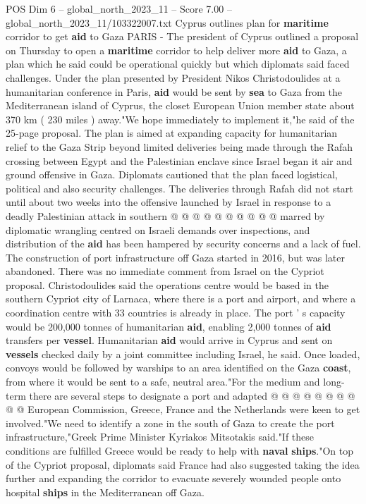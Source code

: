 \begin{textsample}{POS Dim 6 – global\_north\_2023\_11 – Score 7.00 – global\_north\_2023\_11/103322007.txt}  \label{ex:f6_pos_211}
Cyprus outlines plan for \textbf{maritime} corridor to get \textbf{aid} to Gaza PARIS - The president of Cyprus outlined a proposal on Thursday to open a \textbf{maritime} corridor to help deliver more \textbf{aid} to Gaza, a plan which he said could be operational quickly but which diplomats said faced challenges.
Under the plan presented by President Nikos Christodoulides at a humanitarian conference in Paris, \textbf{aid} would be sent by \textbf{sea} to Gaza from the Mediterranean island of Cyprus, the closet European Union member state about 370 km ( 230 miles ) away."We hope immediately to implement it,"he said of the 25-page proposal.
The plan is aimed at expanding capacity for humanitarian relief to the Gaza Strip beyond limited deliveries being made through the Rafah crossing between Egypt and the Palestinian enclave since Israel began it air and ground offensive in Gaza.
Diplomats cautioned that the plan faced logistical, political and also security challenges.
The deliveries through Rafah did not start until about two weeks into the offensive launched by Israel in response to a deadly Palestinian attack in southern @ @ @ @ @ @ @ @ @ @ marred by diplomatic wrangling centred on Israeli demands over inspections, and distribution of the \textbf{aid} has been hampered by security concerns and a lack of fuel.
The construction of port infrastructure off Gaza started in 2016, but was later abandoned.
There was no immediate comment from Israel on the Cypriot proposal.
Christodoulides said the operations centre would be based in the southern Cypriot city of Larnaca, where there is a port and airport, and where a coordination centre with 33 countries is already in place.
The port ' s capacity would be 200,000 tonnes of humanitarian \textbf{aid}, enabling 2,000 tonnes of \textbf{aid} transfers per \textbf{vessel}.
Humanitarian \textbf{aid} would arrive in Cyprus and sent on \textbf{vessels} checked daily by a joint committee including Israel, he said.
Once loaded, convoys would be followed by warships to an area identified on the Gaza \textbf{coast}, from where it would be sent to a safe, neutral area."For the medium and long-term there are several steps to designate a port and adapted @ @ @ @ @ @ @ @ @ @ European Commission, Greece, France and the Netherlands were keen to get involved."We need to identify a zone in the south of Gaza to create the port infrastructure,"Greek Prime Minister Kyriakos Mitsotakis said."If these conditions are fulfilled Greece would be ready to help with \textbf{naval} \textbf{ships}."On top of the Cypriot proposal, diplomats said France had also suggested taking the idea further and expanding the corridor to evacuate severely wounded people onto hospital \textbf{ships} in the Mediterranean off Gaza.

\end{textsample}
